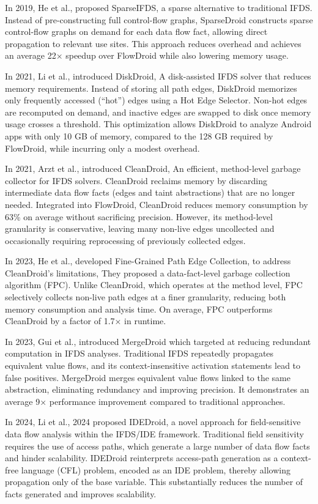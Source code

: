 In 2019, He et al., \cite{he2019performance} proposed SparseIFDS, a sparse alternative to traditional IFDS. Instead of pre-constructing full control-flow graphs, SparseDroid constructs sparse control-flow graphs on demand for each data flow fact, allowing direct propagation to relevant use sites. This approach reduces overhead and achieves an average 22× speedup over FlowDroid while also lowering memory usage.

In 2021, Li et al., \cite{li2021scaling} introduced DiskDroid, A disk-assisted IFDS solver that reduces memory requirements. Instead of storing all path edges, DiskDroid memorizes only frequently accessed (“hot”) edges using a Hot Edge Selector. Non-hot edges are recomputed on demand, and inactive edges are swapped to disk once memory usage crosses a threshold. This optimization allows DiskDroid to analyze Android apps with only 10 GB of memory, compared to the 128 GB required by FlowDroid, while incurring only a modest overhead.

In 2021, Arzt et al., \cite{arzt2021sustainable} introduced CleanDroid, An efficient, method-level garbage collector for IFDS solvers. CleanDroid reclaims memory by discarding intermediate data flow facts (edges and taint abstractions) that are no longer needed. Integrated into FlowDroid, CleanDroid reduces memory consumption by 63\% on average without sacrificing precision. However, its method-level granularity is conservative, leaving many non-live edges uncollected and occasionally requiring reprocessing of previously collected edges.

In 2023, He et al., developed Fine-Grained Path Edge Collection, to address CleanDroid’s limitations, They proposed a data-fact-level garbage collection algorithm (FPC). Unlike CleanDroid, which operates at the method level, FPC selectively collects non-live path edges at a finer granularity, reducing both memory consumption and analysis time. On average, FPC outperforms CleanDroid by a factor of 1.7× in runtime.

In 2023, Gui et al., \cite{gui2023merge} introduced MergeDroid which targeted at reducing redundant computation in IFDS analyses. Traditional IFDS repeatedly propagates equivalent value flows, and its context-insensitive activation statements lead to false positives. MergeDroid merges equivalent value flows linked to the same abstraction, eliminating redundancy and improving precision. It demonstrates an average 9× performance improvement compared to traditional approaches.

In 2024, Li et al., 2024 \cite{li2024boosting} proposed IDEDroid, a novel approach for field-sensitive data flow analysis within the IFDS/IDE framework. Traditional field sensitivity requires the use of access paths, which generate a large number of data flow facts and hinder scalability. IDEDroid reinterprets access-path generation as a context-free language (CFL) problem, encoded as an IDE problem, thereby allowing propagation only of the base variable. This substantially reduces the number of facts generated and improves scalability.


